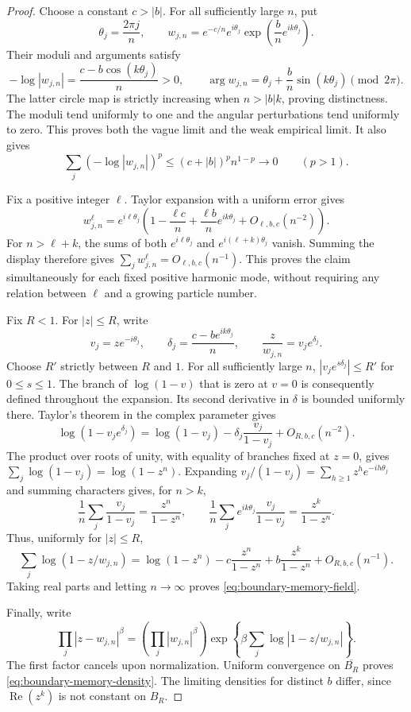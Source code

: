\documentclass[11pt,a4paper]{article}
\numberwithin{equation}{section}
\theoremstyle{definition}
\theoremstyle{remark}
\begin{document}
\begin{proof}
Choose a constant $c>|b|$. For all sufficiently large $n$, put
\[
 \theta_j=\frac{2\pi j}{n},\qquad
 w_{j,n}=e^{-c/n}e^{i\theta_j}
                   \exp\left(\frac b n e^{ik\theta_j}\right).
\]
Their moduli and arguments satisfy
\[
 -\log|w_{j,n}|=\frac{c-b\cos(k\theta_j)}n>0,
 \qquad
 \arg w_{j,n}=\theta_j+\frac b n\sin(k\theta_j)\pmod{2\pi}.
\]
The latter circle map is strictly increasing when $n>|b|k$, proving
distinctness. The moduli tend uniformly to one and the angular
perturbations tend uniformly to zero. This proves both the vague limit
and the weak empirical limit. It also gives
\[
 \sum_j(-\log|w_{j,n}|)^p
 \le(c+|b|)^p n^{1-p}\longrightarrow0\qquad(p>1).
\]

Fix a positive integer $\ell$. Taylor expansion with a uniform error
gives
\[
 w_{j,n}^{\ell}
 =e^{i\ell\theta_j}
   \left(1-\frac{\ell c}n
          +\frac{\ell b}n e^{ik\theta_j}+O_{\ell,b,c}(n^{-2})\right).
\]
For $n>\ell+k$, the sums of both $e^{i\ell\theta_j}$ and
$e^{i(\ell+k)\theta_j}$ vanish. Summing the display therefore gives
$\sum_jw_{j,n}^{\ell}=O_{\ell,b,c}(n^{-1})$. This proves the claim
simultaneously for each fixed positive harmonic mode, without requiring
any relation between $\ell$ and a growing particle number.

Fix $R<1$. For $|z|\le R$, write
\[
 v_j=z e^{-i\theta_j},\qquad
 \delta_j=\frac{c-b e^{ik\theta_j}}n,
 \qquad \frac z{w_{j,n}}=v_j e^{\delta_j}.
\]
Choose $R'$ strictly between $R$ and $1$. For all sufficiently large $n$,
$|v_j e^{s\delta_j}|\le R'$ for $0\le s\le1$. The branch of
$\log(1-v)$ that is zero at $v=0$ is consequently defined throughout
the expansion. Its second derivative in $\delta$ is bounded uniformly
there. Taylor's theorem in the complex parameter gives
\[
 \log(1-v_j e^{\delta_j})
 =\log(1-v_j)-\delta_j\frac{v_j}{1-v_j}
                  +O_{R,b,c}(n^{-2}).
\]
The product over roots of unity, with equality of branches fixed at $z=0$,
gives $\sum_j\log(1-v_j)=\log(1-z^n)$. Expanding
$v_j/(1-v_j)=\sum_{h\ge1}z^h e^{-ih\theta_j}$ and summing characters gives,
for $n>k$,
\[
 \frac1n\sum_j\frac{v_j}{1-v_j}=\frac{z^n}{1-z^n},\qquad
 \frac1n\sum_j e^{ik\theta_j}\frac{v_j}{1-v_j}
       =\frac{z^k}{1-z^n}.
\]
Thus, uniformly for $|z|\le R$,
\[
 \sum_j\log(1-z/w_{j,n})
 =\log(1-z^n)-c\frac{z^n}{1-z^n}
                 +b\frac{z^k}{1-z^n}+O_{R,b,c}(n^{-1}).
\]
Taking real parts and letting $n\to\infty$ proves
\eqref{eq:boundary-memory-field}.

Finally, write
\[
 \prod_j|z-w_{j,n}|^\beta
 =\left(\prod_j|w_{j,n}|^\beta\right)
   \exp\left\{\beta\sum_j\log|1-z/w_{j,n}|\right\}.
\]
The first factor cancels upon normalization. Uniform convergence on
$\overline{B_R}$ proves \eqref{eq:boundary-memory-density}.
The limiting densities for distinct $b$ differ, since
$\operatorname{Re}(z^k)$ is not constant on $B_R$.
\end{proof}
\end{document}

